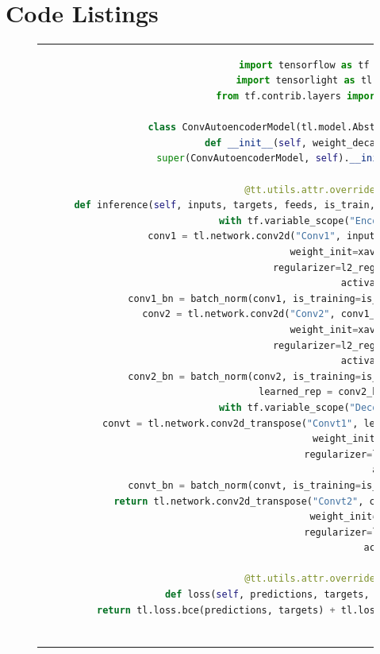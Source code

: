 \clearpage
\section{Code Listings}

\begin{figure}[h!tb]
  \begin{tabular}{c}
  \begin{lstlisting}[language=Python]
import tensorflow as tf
import tensorlight as tl
from tf.contrib.layers import *

class ConvAutoencoderModel(tl.model.AbstractModel):    
  def __init__(self, weight_decay=0.0):
    super(ConvAutoencoderModel, self).__init__(weight_decay)
        
  @tt.utils.attr.override
  def inference(self, inputs, targets, feeds, is_train, device_scope, memory_device):
    with tf.variable_scope("Encoder"):
      conv1 = tl.network.conv2d("Conv1", inputs, 4, (5, 5), (2, 2),
                                   weight_init=xavier_initializer_conv2d(),
                                   regularizer=l2_regularizer(self.weight_decay),
                                   activation=tf.nn.relu)
      conv1_bn = batch_norm(conv1, is_training=is_train, scope="conv1_bn")
      conv2 = tl.network.conv2d("Conv2", conv1_bn, 8, (3, 3), (2, 2),
                                   weight_init=xavier_initializer_conv2d(),
                                   regularizer=l2_regularizer(self.weight_decay),
                                   activation=tf.nn.relu)
      conv2_bn = batch_norm(conv2, is_training=is_train, scope="conv2_bn")
      learned_rep = conv2_bn
    with tf.variable_scope("Decoder"):
      convt = tl.network.conv2d_transpose("Convt1", learned_rep, 4, (3, 3), (2, 2),
                                              weight_init=tl.init.bilinear_initializer(),
                                              regularizer=l2_regularizer(self.weight_decay),
                                              activation=tf.nn.relu)
      convt_bn = batch_norm(convt, is_training=is_train, scope="convt_bn")
      return tl.network.conv2d_transpose("Convt2", convt_bn, 1, (5, 5), (2, 2),
                                              weight_init=tl.init.bilinear_initializer(), 
                                              regularizer=l2_regularizer(self.weight_decay),
                                              activation=tf.nn.sigmoid)
    
  @tt.utils.attr.override
  def loss(self, predictions, targets, device_scope):
    return tl.loss.bce(predictions, targets) + tl.loss.mgdl(predictions, targets)
    

\end{lstlisting}
\end{tabular}
\end{figure}
